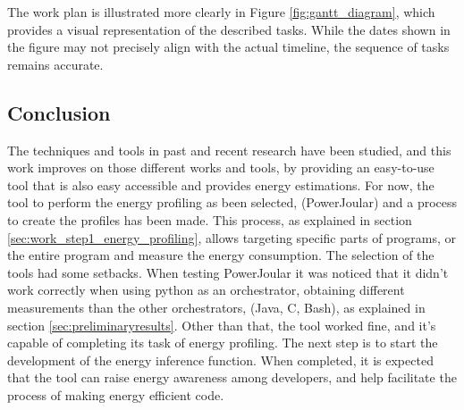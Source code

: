 \documentclass[sigplan]{acmart}
\begin{document}
The work plan is illustrated more clearly in Figure \ref{fig:gantt_diagram}, which provides a visual representation of the described tasks. While the dates shown in the figure may not precisely align with the actual timeline, the sequence of tasks remains accurate.

\subsection{Conclusion}

The techniques and tools in past and recent research have been studied, and this work improves on those different works and tools, by providing an easy-to-use tool that is also easy accessible and provides energy estimations.
For now, the tool to perform the energy profiling as been selected, (PowerJoular) and a process to create the profiles has been made. This process, as explained in section \ref{sec:work_step1_energy_profiling}, allows targeting specific parts of programs, or the entire program and measure the energy consumption. The selection of the tools had some setbacks. When testing PowerJoular it was noticed that it didn't work correctly when using python as an orchestrator, obtaining different measurements than the other orchestrators, (Java, C, Bash), as explained in section \ref{sec:preliminaryresults}. Other than that, the tool worked fine, and it's capable of completing its task of energy profiling. The next step is to start the development of the energy inference function. When completed, it is expected that the tool can raise energy awareness among developers, and help facilitate the process of making energy efficient code.


%
%




\end{document}
